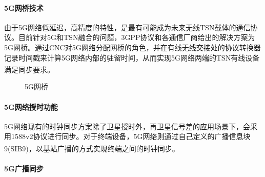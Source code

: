 \documentclass[UTF8,a4paper,12pt]{ctexart}
\numberwithin{equation}{section}
\begin{document}
\paragraph{5G网桥技术}
由于5G网络低延迟，高精度的特性，是最有可能成为未来无线TSN载体的通信协议。目前针对5G和TSN融合的问题，3GPP协议和各通信厂商给出的解决方案为5G网桥。通过CNC对5G网络分配网桥的角色，并在有线无线交接处的协议转换器记录时间戳来计算5G网络内部的驻留时间，从而实现5G网络两端的TSN有线设备满足同步要求\textsuperscript{\cite{larranaga2020analysis}}。

\begin{figure}[htb] 
	\caption{5G网桥}
\end{figure}
\paragraph{5G网络授时功能}
5G网络现有的时钟同步方案除了卫星授时外，再卫星信号差的应用场景下，会采用1588v2协议进行同步。对于终端设备，5G网络则通过自己定义的广播信息块9(SIB9)，以基站广播的方式实现终端之间的时钟同步\textsuperscript{\cite{schungel2021optimized}}。

\paragraph{5G广播同步}
\end{document}
